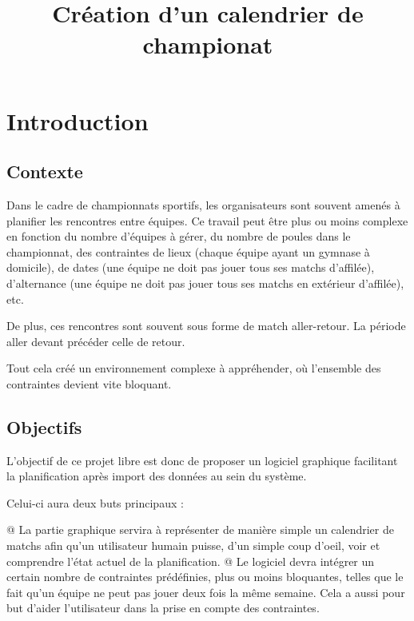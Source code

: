 \documentclass[final, noposter]{polytech/polytech}
\title{Création d'un calendrier de championat}
\begin{document}
\chapter{Introduction}
	\section{Contexte}
		Dans le cadre de championnats sportifs, les organisateurs sont souvent amenés à planifier les rencontres entre équipes. Ce travail peut être plus ou moins complexe en fonction du nombre d'équipes à gérer, du nombre de poules dans le championnat, des contraintes de lieux (chaque équipe ayant un gymnase à domicile), de dates (une équipe ne doit pas jouer tous ses matchs d'affilée), d'alternance (une équipe ne doit pas jouer tous ses matchs en extérieur d'affilée), etc.
		
		De plus, ces rencontres sont souvent sous forme de match aller-retour. La période aller devant précéder celle de retour.
		
		Tout cela créé un environnement complexe à appréhender, où l'ensemble des contraintes devient vite bloquant.

	\section{Objectifs}
		L'objectif de ce projet libre est donc de proposer un logiciel graphique facilitant la planification après import des données au sein du système.
		
		Celui-ci aura deux buts principaux : 
		\begin{easylist}[itemize]
			@ La partie graphique servira à représenter de manière simple un calendrier de matchs afin qu'un utilisateur humain puisse, d'un simple coup d'oeil, voir et comprendre l'état actuel de la planification.
			@ Le logiciel devra intégrer un certain nombre de contraintes prédéfinies, plus ou moins bloquantes, telles que le fait qu'un équipe ne peut pas jouer deux fois la même semaine. Cela a aussi pour but d'aider l'utilisateur dans la prise en compte des contraintes.
		\end{easylist}
\end{document}
